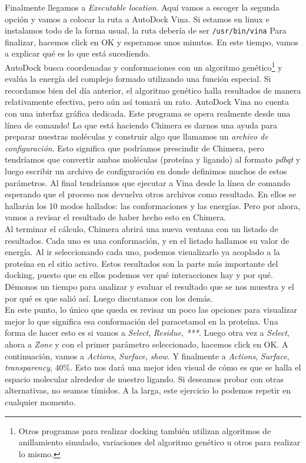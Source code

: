 \documentclass[10pt,letterpaper]{article}
\newcommand{\inlinecode}[1]{
\colorbox{light-gray}{\texttt{#1}}
}
\begin{document}
Finalmente llegamos a \emph{Executable location}. Aqu\'i vamos a escoger la segunda opci\'on y vamos a colocar la ruta a AutoDock Vina. Si estamos en linux e instalamos todo de la forma usual, la ruta deber\'ia de ser \inlinecode{/usr/bin/vina} Para finalizar, hacemos click en OK y esperamos unos minutos. En este tiempo, vamos a explicar qu\'e es lo que est\'a sucediendo.\\

AutoDock busca coordenadas y conformaciones con un algoritmo gen\'etico\footnote{Otros programas para realizar docking tambi\'en utilizan algoritmos de anillamiento simulado, variaciones del algoritmo gen\'etico u otros para realizar lo mismo.} y eval\'ua la energ\'ia del complejo formado utilizando una funci\'on especial. Si recordamos bien del d\'ia anterior, el algoritmo gen\'etico halla resultados de manera relativamente efectiva, pero a\'un as\'i tomar\'a un rato. AutoDock Vina no cuenta con una interfaz gr\'afica dedicada. Este programa se opera realmente desde una l\'inea de comando! Lo que est\'a haciendo Chimera es darnos una ayuda para preparar nuestras mol\'eculas y construir algo que llamamos un \emph{archivo de configuraci\'on}. Esto significa que podr\'iamos prescindir de Chimera, pero tendr\'iamos que convertir ambas mol\'eculas (prote\'ina y ligando) al formato \emph{pdbqt} y luego escribir un archivo de configuraci\'on en donde definimos muchos de estos par\'ametros. Al final tendr\'iamos que ejecutar a Vina desde la l\'inea de comando esperando que el proceso nos devuelva otros archivos como resultado. En ellos se hallar\'an los 10 modos hallados: las conformaciones y las energ\'ias. Pero por ahora, vamos a revisar el resultado de haber hecho esto en Chimera.\\

Al terminar el c\'alculo, Chimera abrir\'a una nueva ventana con un listado de resultados. Cada uno es una conformaci\'on, y en el listado hallamos su valor de energ\'ia. Al ir seleccionando cada uno, podemos visualizarlo ya acoplado a la prote\'ina en el sitio activo. Estos resultados son la parte m\'as importante del docking, puesto que en ellos podemos ver qu\'e interacciones hay y por qu\'e. D\'emonos un tiempo para analizar y evaluar el resultado que se nos muestra y el por qu\'e es que sali\'o as\'i. Luego discutamos con los dem\'as.\\

En este punto, lo \'unico que queda es revisar un poco las opciones para visualizar mejor lo que significa esa conformaci\'on del paracetamol en la prote\'ina. Una forma de hacer esto es si vamos a \emph{Select}, \emph{Residue}, \emph{***}. Luego otra vez a \emph{Select}, ahora a \emph{Zone} y con el primer par\'ametro seleccionado, hacemos click en OK. A continuaci\'on, vamos a \emph{Actions}, \emph{Surface}, \emph{show}. Y finalmente a \emph{Actions}, \emph{Surface}, \emph{transparency}, $40\%$. Esto nos dar\'a una mejor idea visual de c\'omo es que se halla el espacio molecular alrededor de nuestro ligando. Si deseamos probar con otras alternativas, no seamos t\'imidos. A la larga, este ejercicio lo podemos repetir en cualquier momento.\\
\end{document}
